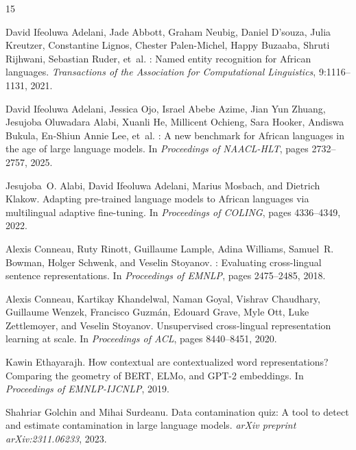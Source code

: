 \documentclass[11pt]{article}
\begin{document}
\begin{thebibliography}{15}

David Ifeoluwa Adelani, Jade Abbott, Graham Neubig, Daniel D'souza, Julia
  Kreutzer, Constantine Lignos, Chester Palen-Michel, Happy Buzaaba, Shruti
  Rijhwani, Sebastian Ruder, et~al.
: Named entity recognition for {African} languages.
\newblock \emph{Transactions of the Association for Computational Linguistics},
  9:1116--1131, 2021.

David Ifeoluwa Adelani, Jessica Ojo, Israel Abebe Azime, Jian Yun Zhuang,
  Jesujoba Oluwadara Alabi, Xuanli He, Millicent Ochieng, Sara Hooker, Andiswa
  Bukula, En-Shiun Annie Lee, et~al.
: A new benchmark for {African} languages in the age of
  large language models.
\newblock In \emph{Proceedings of NAACL-HLT}, pages 2732--2757, 2025.

Jesujoba~O. Alabi, David Ifeoluwa Adelani, Marius Mosbach, and Dietrich Klakow.
\newblock Adapting pre-trained language models to {African} languages via
  multilingual adaptive fine-tuning.
\newblock In \emph{Proceedings of COLING}, pages 4336--4349, 2022.

Alexis Conneau, Ruty Rinott, Guillaume Lample, Adina Williams, Samuel~R.
  Bowman, Holger Schwenk, and Veselin Stoyanov.
: Evaluating cross-lingual sentence representations.
\newblock In \emph{Proceedings of EMNLP}, pages 2475--2485, 2018.

Alexis Conneau, Kartikay Khandelwal, Naman Goyal, Vishrav Chaudhary, Guillaume
  Wenzek, Francisco Guzm\'an, Edouard Grave, Myle Ott, Luke Zettlemoyer, and
  Veselin Stoyanov.
\newblock Unsupervised cross-lingual representation learning at scale.
\newblock In \emph{Proceedings of ACL}, pages 8440--8451, 2020.

Kawin Ethayarajh.
\newblock How contextual are contextualized word representations? {C}omparing
  the geometry of {BERT}, {ELMo}, and {GPT-2} embeddings.
\newblock In \emph{Proceedings of EMNLP-IJCNLP}, 2019.

Shahriar Golchin and Mihai Surdeanu.
\newblock Data contamination quiz: A tool to detect and estimate contamination
  in large language models.
\newblock \emph{arXiv preprint arXiv:2311.06233}, 2023.


\end{thebibliography}
\end{document}
